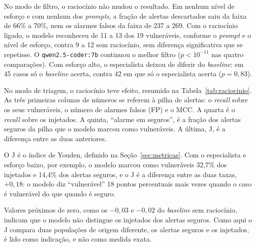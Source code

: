 No modo de filtro, o raciocínio não mudou o resultado. Em nenhum nível de esforço e com nenhum dos \textit{prompts}, a fração de alertas descartados saiu da faixa de 66\% a 70\%, nem os alarmes falsos da faixa de 237 a 269. Com o raciocínio ligado, o modelo reconheceu de 11 a 13 dos 19 vulneráveis, conforme o \textit{prompt} e o nível de esforço, contra 9 a 12 sem raciocínio, sem diferença significativa que se repetisse. O \texttt{qwen2.5-coder:7b} continuou o melhor filtro ($p < 10^{-11}$ nas quatro comparações). Com esforço alto, o especialista deixou de diferir do \textit{baseline}: em 45 casos só o \textit{baseline} acerta, contra 42 em que só o especialista acerta ($p = 0{,}83$).

No modo de triagem, o raciocínio teve efeito, resumido na Tabela~\ref{tab:raciocinio}. As três primeiras colunas de números se referem à pilha de alertas: o \textit{recall} sobre os seus vulneráveis, o número de alarmes falsos (FP) e o MCC. A quarta é o \textit{recall} sobre os injetados. A quinta, ``alarme em seguros'', é a fração dos alertas seguros da pilha que o modelo marcou como vulneráveis. A última, J, é a diferença entre as duas anteriores.

O J é o índice de Youden, definido na Seção~\ref{sec:metricas}. Com o especialista e esforço baixo, por exemplo, o modelo marcou como vulneráveis 32,7\% dos injetados e 14,4\% dos alertas seguros, e o J é a diferença entre as duas taxas, $+0{,}18$: o modelo diz ``vulnerável'' 18 pontos percentuais mais vezes quando o caso é vulnerável do que quando é seguro.

Valores próximos de zero, como os $-0{,}03$ e $-0{,}02$ do \textit{baseline} sem raciocínio, indicam que o modelo não distingue os injetados dos alertas seguros. Como aqui o J compara duas populações de origem diferente, os alertas seguros e os injetados, é lido como indicação, e não como medida exata.

